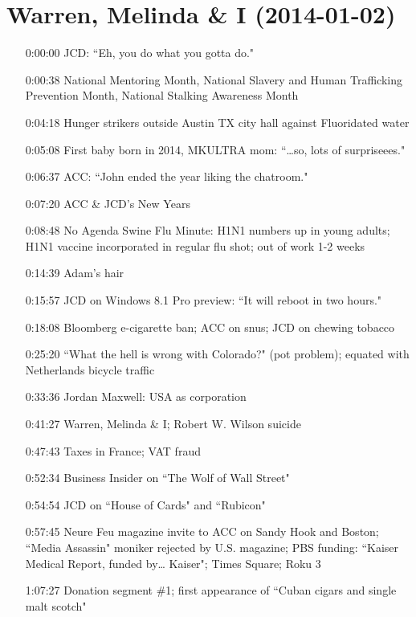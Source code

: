 \documentclass{report}
\newcommand{\mono}[1]{{\fontspec{Courier}#1}}
\begin{document}
\setcounter{section}{579}\section[Warren, Melinda \& I]{Warren, Melinda \& I \small{(2014-01-02)}}
\begin{itemize}
\item[\mono{0:00:00}] JCD: ``Eh, you do what you gotta do."
\item[\mono{0:00:38}] National Mentoring Month, National Slavery and Human Trafficking Prevention Month, National Stalking Awareness Month
\item[\mono{0:04:18}] Hunger strikers outside Austin TX city hall against Fluoridated water
\item[\mono{0:05:08}] First baby born in 2014, MKULTRA mom: ``…so, lots of surpriseees."
\item[\mono{0:06:37}] ACC: ``John ended the year liking the chatroom."
\item[\mono{0:07:20}] ACC \& JCD's New Years
\item[\mono{0:08:48}] No Agenda Swine Flu Minute: H1N1 numbers up in young adults; H1N1 vaccine incorporated in regular flu shot; out of work 1-2 weeks
\item[\mono{0:14:39}] Adam's hair
\item[\mono{0:15:57}] JCD on Windows 8.1 Pro preview: ``It will reboot in two hours."
\item[\mono{0:18:08}] Bloomberg e-cigarette ban; ACC on snus; JCD on chewing tobacco
\item[\mono{0:25:20}] ``What the hell is wrong with Colorado?" (pot problem); equated with Netherlands bicycle traffic
\item[\mono{0:33:36}] Jordan Maxwell: USA as corporation
\item[\mono{0:41:27}] Warren, Melinda \& I; Robert W. Wilson suicide
\item[\mono{0:47:43}] Taxes in France; VAT fraud
\item[\mono{0:52:34}] Business Insider on ``The Wolf of Wall Street"
\item[\mono{0:54:54}] JCD on ``House of Cards" and ``Rubicon"
\item[\mono{0:57:45}] Neure Feu magazine invite to ACC on Sandy Hook and Boston; ``Media Assassin" moniker rejected by U.S. magazine; PBS funding: ``Kaiser Medical Report, funded by… Kaiser"; Times Square; Roku 3
\item[\mono{1:07:27}] Donation segment \#1; first appearance of ``Cuban cigars and single malt scotch"

\end{itemize}
\end{document}
